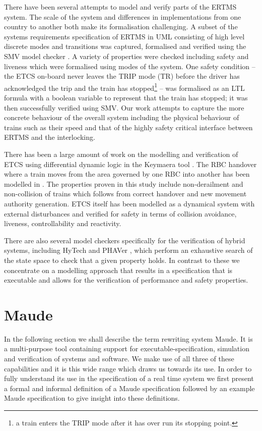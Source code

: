 There have been several attempts to model and verify parts of the ERTMS system. The scale of the system and differences in implementations from one country to another both make its formalisation challenging. A subset of the systems requirements specification of ERTMS in UML consisting of high level discrete modes and transitions was captured, formalised and verified using the SMV model checker \cite{MG14}. A variety of properties were checked including safety and liveness which were formalised using modes of the system. One safety condition -- the ETCS on-board never leaves the TRIP mode (TR) before the driver has acknowledged the trip and the train has stopped\footnote{a train enters the TRIP mode after it has over run its stopping point.} -- was formalised as an LTL formula with a boolean variable to represent that the train has stopped; it was then successfully verified using SMV. Our work attempts to capture the more concrete behaviour of the overall system including the physical behaviour of trains such as their speed and that of the highly safety critical interface between ERTMS and the interlocking. 

There has been a large amount of work on the modelling and verification of ETCS using differential dynamic logic \cite{AP08} in the Keymaera tool \cite{AP08b}. The RBC handover where a train moves from the area governed by one RBC into another has been modelled in \cite{YL11}. The properties proven in this study include non-derailment and non-collision of trains which follows from correct handover and new movement authority generation. ETCS \cite{AP09} itself has been modelled as a dynamical system with external disturbances and verified for safety in terms of collision avoidance, liveness, controllability and reactivity.

There are also several model checkers specifically for the verification of hybrid systems, including HyTech \cite{AR96} and PHAVer \cite{GF05}, which perform an exhaustive search of the state space to check that a given property holds. In contrast to these we concentrate on a modelling approach that results in a specification that is executable and allows for the verification of performance and safety properties.

\section{Maude}
In the following section we shall describe the term rewriting system Maude. It is a multi-purpose tool containing support for executable-specification, simulation and verification of systems and software. We make use of all three of these capabilities and it is this wide range which draws us towards its use. In order to fully understand its use in the specification of a real time system we first present a formal and informal definition of a Maude specification followed by an example Maude specification to give insight into these definitions.



